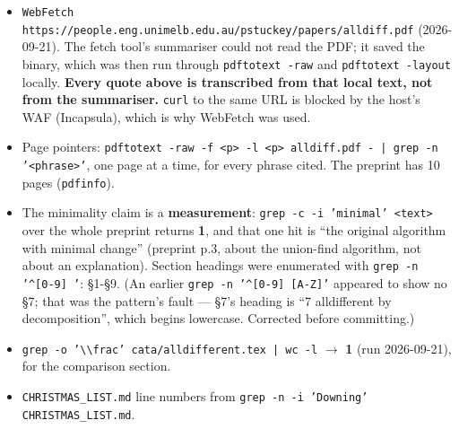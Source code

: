\documentclass[10pt,a4paper]{article}
\newenvironment{pubblock}{%
  \par\smallskip
  \def\FrameCommand{\textcolor{litbar}{\vrule width 2.5pt}\hspace{9pt}}%
  \MakeFramed{\advance\hsize-\width\FrameRestore}}%
  {\endMakeFramed\par\smallskip}
\begin{document}
\begin{pubblock}
{\begin{itemize}
\item \texttt{WebFetch https:/\allowbreak{}/\allowbreak{}people.\allowbreak{}eng.\allowbreak{}unimelb.\allowbreak{}edu.\allowbreak{}au/\allowbreak{}pstuckey/\allowbreak{}papers/\allowbreak{}alldiff.\allowbreak{}pdf} (2026-09-21). The fetch tool's summariser could not read the PDF; it saved the binary, which was then run through \texttt{pdftotext -raw} and \texttt{pdftotext -layout} locally. \textbf{Every quote above is transcribed from that local text, not from the summariser.} \texttt{curl} to the same URL is blocked by the host's WAF (Incapsula), which is why WebFetch was used.
\item Page pointers: \texttt{pdftotext -\allowbreak{}raw -\allowbreak{}f <p> -\allowbreak{}l <p> alldiff.\allowbreak{}pdf -\allowbreak{} | grep -\allowbreak{}n '<phrase>'}, one page at a time, for every phrase cited. The preprint has 10 pages (\texttt{pdfinfo}).
\item The minimality claim is a \textbf{measurement}: \texttt{grep -\allowbreak{}c -\allowbreak{}i 'minimal' <text>} over the whole preprint returns \textbf{1}, and that one hit is ``the original algorithm with minimal change'' (preprint p.3, about the union-find algorithm, not about an explanation). Section headings were enumerated with \texttt{grep -n '\textasciicircum{}[0-9] '}: \S{}1-\S{}9. (An earlier \texttt{grep -n '\textasciicircum{}[0-9] [A-Z]'} appeared to show no \S{}7; that was the pattern's fault --- \S{}7's heading is ``7 alldifferent by decomposition'', which begins lowercase. Corrected before committing.)
\item \texttt{grep -\allowbreak{}o '\textbackslash{}\textbackslash{}frac' cata/\allowbreak{}alldifferent.\allowbreak{}tex | wc -\allowbreak{}l} $\rightarrow$ \textbf{1} (run 2026-09-21), for the comparison section.
\item \texttt{CHRISTMAS\_LIST.md} line numbers from \texttt{grep -\allowbreak{}n -\allowbreak{}i 'Downing' CHRISTMAS\_\allowbreak{}LIST.\allowbreak{}md}.
\end{itemize}
\par}
\end{pubblock}
\end{document}
